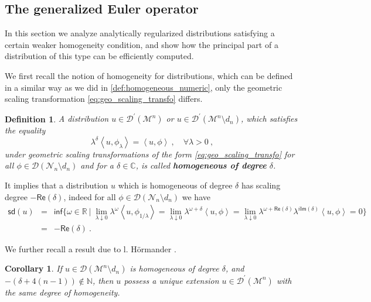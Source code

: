 \documentclass[11pt]{book}
\newcommand{\sd}{\mathsf{sd}}
\renewcommand{\Re}{\mathsf{Re}}
\renewcommand{\Im}{\mathsf{Im}}
\renewcommand{\inf}{\mathsf{inf}}
\newcommand{\sm}[1]{\left\langle#1\right\rangle}
\newcommand{\Dcal}{\mathcal{D}}
\newcommand{\Mcal}{\mathcal{M}}
\newcommand{\Ncal}{\mathcal{N}}
\newcommand{\Cbb}{\mathbb{C}}
\newcommand{\Nbb}{\mathbb{N}}
\newcommand{\Rbb}{\mathbb{R}}
\theoremstyle{break}
\newtheorem{corollary}{Corollary}[chapter]
\newtheorem{definition}{Definition}[chapter]
\begin{document}
\subsection{The generalized Euler operator}
\label{p:EULER}


In this section we analyze analytically regularized distributions satisfying a certain weaker homogeneity condition, and show how the principal part of a distribution of this type can be efficiently computed.

\bigskip


We first recall the notion of homogeneity for distributions, which can be defined in a similar way as we did in \ref{def:homogeneous_numeric}, only the geometric scaling transformation \eqref{eq:geo_scaling_transfo} differs.


\begin{definition}\label{def:homogeneous}
A distribution $u \in \Dcal^\prime(\Mcal^n)$ or $u\in \Dcal^\prime(\Mcal^n\setminus d_n)$, which satisfies the equality 
%
\begin{equation}
\lambda^{\delta} \sm{ u , \phi_\lambda } = \sm{ u , \phi } \ , \quad \forall \lambda > 0 \ , 
\label{eq:homo_distrib}
\end{equation}
%
under geometric scaling transformations of the form \eqref{eq:geo_scaling_transfo} for all $\phi\in\Dcal(\Ncal_n\setminus d_n)$ and for a $\delta\in\Cbb$, is called \textbf{homogeneous of degree} $\delta$. 
\end{definition}


It implies that a distribution $u$ which is homogeneous of degree $\delta$ has scaling degree $-\Re(\delta)$, indeed for all $\phi\in\Dcal(\Ncal_n\setminus d_n)$ we have
%
\begin{eqnarray*}
\sd(u) &=& \inf\bigg\{ \omega \in \Rbb \ \bigg| \ \lim_{\lambda \downarrow 0} \lambda^\omega \sm{u,\phi_{1/\lambda}} = \lim_{\lambda \downarrow 0} \lambda^{\omega+\delta} \sm{u,\phi} = \lim_{\lambda \downarrow 0} \lambda^{\omega+\Re(\delta)} \lambda^{i\Im(\delta)} \sm{u,\phi}
= 0  \bigg\} \\
&=& - \Re(\delta) \ .
\end{eqnarray*}


We further recall a result due to l. Hörmander \cite[theorem 3.2.3]{hormander_analysis_1990}.


\begin{corollary}\label{corol:exte_homo}
If $u\in\Dcal(\Mcal^n\setminus d_n)$ is homogeneous of degree $\delta$, and $-(\delta+4(n-1)) \notin \Nbb$, then $u$ possess a unique extension $u \in \Dcal^\prime(\Mcal^n)$ with the same degree of homogeneity.
\end{corollary}
\end{document}

